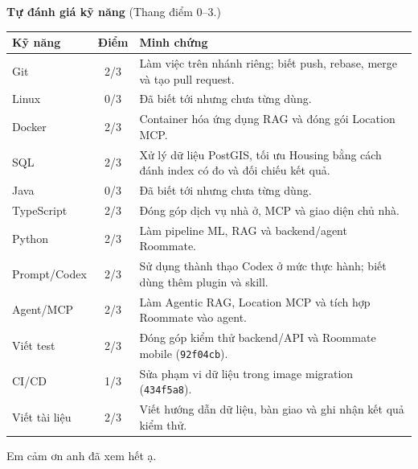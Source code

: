 \documentclass[10pt,a4paper]{article}
\begin{document}
\newpage
\textbf{Tự đánh giá kỹ năng}
{\small\color{muted}(Thang điểm 0--3.)}
\par\vspace{2pt}
{\fontsize{9.2}{10.5}\selectfont
\setlength{\tabcolsep}{4pt}
\renewcommand{\arraystretch}{1.08}
\begin{tabular}{@{}p{34mm}p{11mm}p{\dimexpr\linewidth-45mm-4\tabcolsep\relax}@{}}
\hline
\textbf{\color{ink}Kỹ năng} & \textbf{\color{ink}Điểm} & \textbf{\color{ink}Minh chứng} \\
\hline
Git & \multicolumn{1}{c}{2/3} & Làm việc trên nhánh riêng; biết push, rebase, merge và tạo pull request. \\
Linux & \multicolumn{1}{c}{0/3} & Đã biết tới nhưng chưa từng dùng. \\
Docker & \multicolumn{1}{c}{2/3} & Container hóa ứng dụng RAG và đóng gói Location MCP. \\
SQL & \multicolumn{1}{c}{2/3} & Xử lý dữ liệu PostGIS, tối ưu Housing bằng cách đánh index có đo và đối chiếu kết quả. \\
Java & \multicolumn{1}{c}{0/3} & Đã biết tới nhưng chưa từng dùng. \\
TypeScript & \multicolumn{1}{c}{2/3} & Đóng góp dịch vụ nhà ở, MCP và giao diện chủ nhà. \\
Python & \multicolumn{1}{c}{2/3} & Làm pipeline ML, RAG và backend/agent Roommate. \\
Prompt/Codex & \multicolumn{1}{c}{2/3} & Sử dụng thành thạo Codex ở mức thực hành; biết dùng thêm plugin và skill. \\
Agent/MCP & \multicolumn{1}{c}{2/3} & Làm Agentic RAG, Location MCP và tích hợp Roommate vào agent. \\
Viết test & \multicolumn{1}{c}{2/3} & Đóng góp kiểm thử backend/API và Roommate mobile (\texttt{92f04cb}). \\
CI/CD & \multicolumn{1}{c}{1/3} & Sửa phạm vi dữ liệu trong image migration (\texttt{434f5a8}). \\
Viết tài liệu & \multicolumn{1}{c}{2/3} & Viết hướng dẫn dữ liệu, bàn giao và ghi nhận kết quả kiểm thử. \\
\hline
\end{tabular}}

Em cảm ơn anh đã xem hết ạ.
\end{document}
